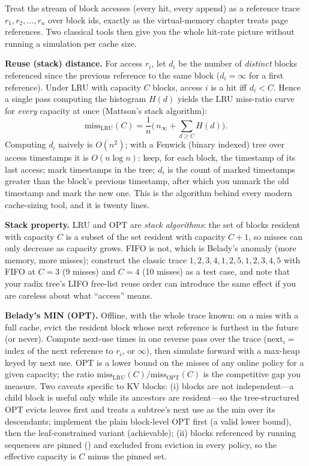 Treat the stream of block accesses (every  hit, every append) as a reference trace $r_1, r_2, \dots, r_n$ over block ids, exactly as the virtual-memory chapter treats page references. Two classical tools then give you the whole hit-rate picture without running a simulation per cache size.

\textbf{Reuse (stack) distance.} For access $r_i$, let $d_i$ be the number of \emph{distinct} blocks referenced since the previous reference to the same block ($d_i = \infty$ for a first reference). Under LRU with capacity $C$ blocks, access $i$ is a hit iff $d_i < C$. Hence a single pass computing the histogram $H(d)$ yields the LRU miss-ratio curve for \emph{every} capacity at once (Mattson's stack algorithm):
\begin{equation}
\text{miss}_{\text{LRU}}(C) = \frac{1}{n}\Big(\,n_\infty + \sum_{d \ge C} H(d)\Big).
\label{eq:mrc}
\end{equation}
Computing $d_i$ naively is $O(n^2)$; with a Fenwick (binary indexed) tree over access timestamps it is $O(n\log n)$: keep, for each block, the timestamp of its last access; mark timestamps in the tree; $d_i$ is the count of marked timestamps greater than the block's previous timestamp, after which you unmark the old timestamp and mark the new one. This is the algorithm behind every modern cache-sizing tool, and it is twenty lines.

\textbf{Stack property.} LRU and OPT are \emph{stack algorithms}: the set of blocks resident with capacity $C$ is a subset of the set resident with capacity $C+1$, so misses can only decrease as capacity grows. FIFO is not, which is Belady's anomaly (more memory, more misses); construct the classic trace $1,2,3,4,1,2,5,1,2,3,4,5$ with FIFO at $C=3$ (9 misses) and $C=4$ (10 misses) as a test case, and note that your radix tree's LIFO free-list reuse order can introduce the same effect if you are careless about what ``access'' means.

\textbf{Belady's MIN (OPT).} Offline, with the whole trace known: on a miss with a full cache, evict the resident block whose next reference is furthest in the future (or never). Compute next-use times in one reverse pass over the trace ($\text{next}_i = $ index of the next reference to $r_i$, or $\infty$), then simulate forward with a max-heap keyed by next use. OPT is a lower bound on the misses of any online policy for a given capacity; the ratio $\text{miss}_{\text{LRU}}(C)/\text{miss}_{\text{OPT}}(C)$ is the competitive gap you measure. Two caveats specific to KV blocks: (i) blocks are not independent---a child block is useful only while its ancestors are resident---so the tree-structured OPT evicts leaves first and treats a subtree's next use as the min over its descendants; implement the plain block-level OPT first (a valid lower bound), then the leaf-constrained variant (achievable); (ii) blocks referenced by running sequences are pinned () and excluded from eviction in every policy, so the effective capacity is $C$ minus the pinned set.

